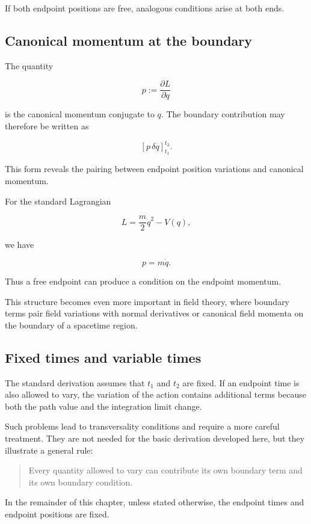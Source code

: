 If both endpoint positions are free, analogous conditions arise at both ends.

\subsection{Canonical momentum at the boundary}

The quantity

\[
p
:=
\frac{\partial L}{\partial\dot q}
\]

is the canonical momentum conjugate to \(q\). The boundary contribution may therefore be written as

\[
[p\,\delta q]_{t_{1}}^{t_{2}}.
\]

This form reveals the pairing between endpoint position variations and canonical momentum.

For the standard Lagrangian

\[
L
=
\frac{m}{2}\dot q^{2}-V(q),
\]

we have

\[
p=m\dot q.
\]

Thus a free endpoint can produce a condition on the endpoint momentum.

This structure becomes even more important in field theory, where boundary terms pair field variations with normal derivatives or canonical field momenta on the boundary of a spacetime region.

\subsection{Fixed times and variable times}

The standard derivation assumes that \(t_{1}\) and \(t_{2}\) are fixed. If an endpoint time is also allowed to vary, the variation of the action contains additional terms because both the path value and the integration limit change.

Such problems lead to transversality conditions and require a more careful treatment. They are not needed for the basic derivation developed here, but they illustrate a general rule:

\begin{quote}
Every quantity allowed to vary can contribute its own boundary term and its own boundary condition.
\end{quote}

In the remainder of this chapter, unless stated otherwise, the endpoint times and endpoint positions are fixed.

